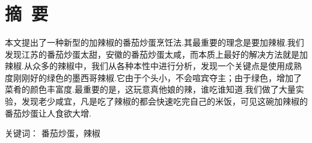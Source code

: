 %
%
% 
%




\setlength{\baselineskip}{20pt}

\title{\hei{}\bfseries\mytitle}
\maketitle
\thispagestyle{empty}
\clearpage



{\pagestyle{plain}
\tableofcontents
\clearpage}


\section*{摘~要}
本文提出了一种新型的加辣椒的番茄炒蛋烹饪法.其最重要的理念是要加辣椒.我们发现江苏的番茄炒蛋太甜，安徽的番茄炒蛋太咸，而本质上最好的解决方法就是加辣椒.从众多的辣椒中，我们从各种本性中进行分析，发现一个关键点是使用成熟度刚刚好的绿色的墨西哥辣椒.它由于个头小，不会喧宾夺主；由于绿色，增加了菜肴的颜色丰富度.最重要的是，这玩意真他娘的辣，谁吃谁知道.我们做了大量实验，发现老少咸宜，凡是吃了辣椒的都会快速吃完自己的米饭，可见这碗加辣椒的番茄炒蛋让人食欲大增.

\vspace{1em}\noindent
{\hei 关键词：}
{\song 番茄炒蛋，辣椒}
\clearpage



{\centering{}\bfseries\sffamily \mytitleEN\par}
\vspace{1em}

